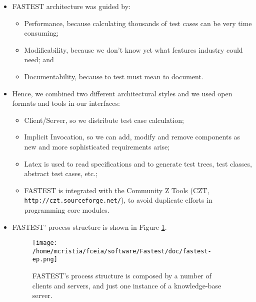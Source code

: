 \begin{itemize}

\item FASTEST architecture was guided by:

\begin{itemize}

\item Performance, because calculating thousands of test cases can be very time consuming;

\item Modificability, because we don't know yet what features industry could need; and

\item Documentability, because to test must mean to document.

\end{itemize}

\item Hence, we combined two different architectural styles and we used open formats and tools in our interfaces:

\begin{itemize}

\item Client/Server, so we distribute test case calculation;

\item Implicit Invocation, so we can add, modify and remove components as new and more sophisticated requirements arise;

\item Latex is used to read specifications and to generate test trees, test classes, abstract test cases, etc.;

\item FASTEST is integrated with the Community Z Tools (CZT, \verb+http://czt.sourceforge.net/+), to avoid duplicate efforts in programming core modules.

\end{itemize}

\item FASTEST' process structure is shown in Figure \ref{fep}.

\begin{figure}
\begin{center}
\texttt{[image: /home/mcristia/fceia/software/Fastest/doc/fastest-ep.png]}
\end{center}
\caption{\label{fep}FASTEST's process structure is composed by a number of clients and servers, and just one instance of a knowledge-base server.}
\end{figure}


\end{itemize}
